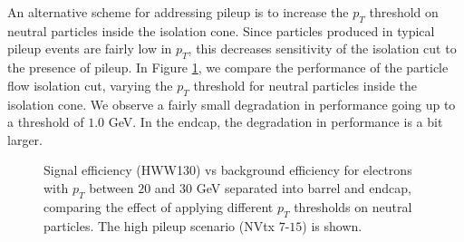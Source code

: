 An alternative scheme for addressing pileup is to increase the $p_{T}$ threshold on neutral 
particles inside the isolation cone. Since particles produced in typical pileup events are
fairly low in $p_{T}$, this decreases sensitivity of the isolation cut to the presence of 
pileup. In Figure \ref{fig:IsoPerformance_Ele_PtThresholds}, we compare the performance
of the particle flow isolation cut, varying the $p_{T}$ threshold for neutral particles
inside the isolation cone. We observe a fairly small degradation in performance going up
to a threshold of $1.0$ GeV. In the endcap, the degradation in performance is a bit
larger. 

\begin{figure}[!htbp]
\begin{center}
\caption{Signal efficiency (HWW130) vs background efficiency for electrons with $p_{T}$ between $20$ and $30$ GeV
separated into barrel and endcap, comparing the effect of applying different $p_{T}$ thresholds on neutral particles.
The high pileup scenario (NVtx $7$-$15$) is shown.}
\label{fig:IsoPerformance_Ele_PtThresholds}
\end{center}
\end{figure}

